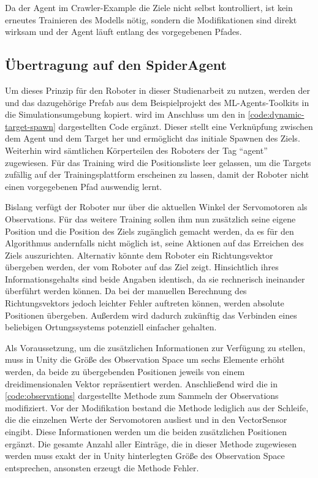 Da der Agent im Crawler-Example die Ziele nicht selbst kontrolliert, ist kein erneutes Trainieren des Modells nötig, sondern die Modifikationen sind direkt wirksam und der Agent läuft entlang des vorgegebenen Pfades.

\subsection{Übertragung auf den SpiderAgent}
Um dieses Prinzip für den Roboter in dieser Studienarbeit zu nutzen, werden der  und das dazugehörige Prefab aus dem Beispielprojekt des ML-Agents-Toolkits in die Simulationsumgebung kopiert.
 wird im Anschluss um den in \autoref{code:dynamic-target-spawn} dargestellten Code ergänzt.
Dieser stellt eine Verknüpfung zwischen dem Agent und dem Target her und ermöglicht das initiale Spawnen des Ziels.
Weiterhin wird sämtlichen Körperteilen des Roboters der Tag \enquote{agent} zugewiesen.
Für das Training wird die Positionsliste leer gelassen, um die Targets zufällig auf der Trainingsplattform erscheinen zu lassen, damit der Roboter nicht einen vorgegebenen Pfad auswendig lernt.


\begin{figure}
    
\end{figure}

Bislang verfügt der Roboter nur über die aktuellen Winkel der Servomotoren als Observations.
Für das weitere Training sollen ihm nun zusätzlich seine eigene Position und die Position des Ziels zugänglich gemacht werden, da es für den Algorithmus andernfalls nicht möglich ist, seine Aktionen auf das Erreichen des Ziels auszurichten.
Alternativ könnte dem Roboter ein Richtungsvektor übergeben werden, der vom Roboter auf das Ziel zeigt.
Hinsichtlich ihres Informationsgehalts sind beide Angaben identisch, da sie rechnerisch ineinander überführt werden können.
Da bei der manuellen Berechnung des Richtungsvektors jedoch leichter Fehler auftreten können, werden absolute Positionen übergeben.
Außerdem wird dadurch zukünftig das Verbinden eines beliebigen Ortungssystems potenziell einfacher gehalten.

Als Voraussetzung, um die zusätzlichen Informationen zur Verfügung zu stellen, muss in Unity die Größe des Observation Space um sechs Elemente erhöht werden, da beide zu übergebenden Positionen jeweils von einem dreidimensionalen Vektor repräsentiert werden.
Anschließend wird die in \autoref{code:observations} dargestellte Methode zum Sammeln der Observations modifiziert.
Vor der Modifikation bestand die Methode lediglich aus der Schleife, die die einzelnen Werte der Servomotoren ausliest und in den VectorSensor eingibt.
Diese Informationen werden um die beiden zusätzlichen Positionen ergänzt.
Die gesamte Anzahl aller Einträge, die in dieser Methode zugewiesen werden muss exakt der in Unity hinterlegten Größe des Observation Space entsprechen, ansonsten erzeugt die Methode Fehler.

